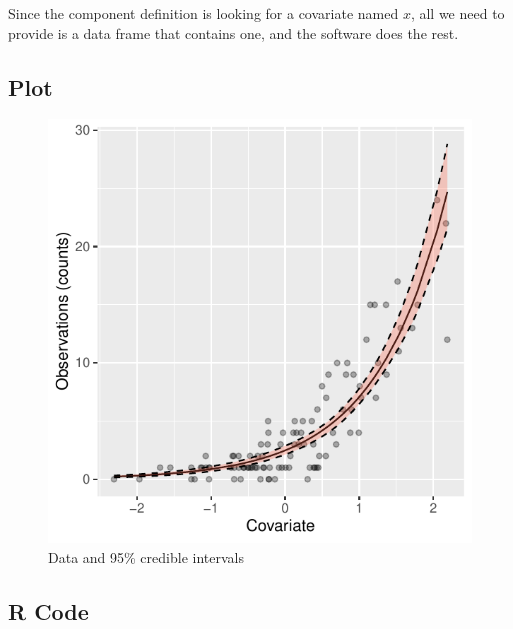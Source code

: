 \documentclass[
  letterpaper,
  DIV=11,
  numbers=noendperiod]{scrartcl}
\begin{document}
Since the component definition is looking for a covariate named \(x\),
all we need to provide is a data frame that contains one, and the
software does the rest.

\subsection{Plot}

\begin{figure}[H]

{\centering \includegraphics{day1_practical_files/figure-pdf/unnamed-chunk-49-1.pdf}

}

\caption{Data and 95\% credible intervals}

\end{figure}%

\subsection{R Code}
\end{document}
